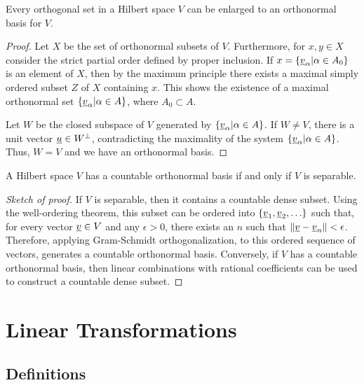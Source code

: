 \begin{theorem}
Every orthogonal set in a Hilbert space $V$ can be enlarged to an orthonormal basis for $V$.
\end{theorem}
\begin{proof}
Let $X$ be the set of orthonormal subsets of $V$.
Furthermore, for $x, y \in X$ consider the strict partial order defined by proper inclusion.
If $x = \left\{ \underline{v}_{\alpha} | \alpha \in A_0 \right\}$ is an element of $X$, then by the maximum principle there exists a maximal simply ordered subset $Z$ of $X$ containing $x$.
This shows the existence of a maximal orthonormal set $\left\{ \underline{v}_{\alpha} | \alpha \in A \right\}$, where $A_0 \subset A$.

Let $W$ be the closed subspace of $V$ generated by $\left\{ \underline{v}_{\alpha} | \alpha \in A \right\}$.
If $W \neq V$, there is a unit vector $\underline{u} \in W^{\bot}$, contradicting the maximality of the system $\left\{ \underline{v}_{\alpha} | \alpha \in A \right\}$.
Thus, $W = V$ and we have an orthonormal basis.
\end{proof}

\begin{theorem} \label{theorem:SeparableHilbertSpace}
A Hilbert space $V$ has a countable orthonormal basis if and only if $V$ is separable.
\end{theorem}
\begin{proof}[Sketch of proof]
If $V$ is separable, then it contains a countable dense subset.
Using the well-ordering theorem, this subset can be ordered into $\{ \underline{v}_1 , \underline{v}_2 , \ldots \}$ such that, for every vector $\underline{v}\in V$ and any $\epsilon>0$, there exists an $n$ such that $\left\| \underline{v} - \underline{v}_n \right\| < \epsilon$.
Therefore, applying Gram-Schmidt orthogonalization, to this ordered sequence of vectors, generates a countable orthonormal basis.
Conversely, if $V$ has a countable orthonormal basis, then linear combinations with rational coefficients can be used to construct a countable dense subset.
\end{proof}

\section{Linear Transformations}

\subsection{Definitions}

